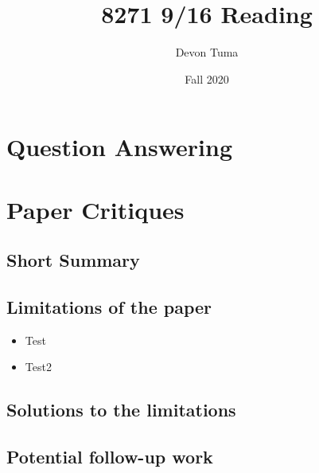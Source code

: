 \documentclass[11pt]{article}
\title{8271 9/16 Reading}
\author{Devon Tuma}
\date{Fall 2020}
\begin{document}
\maketitle

\section*{Question Answering}

\section*{Paper Critiques}

\subsection*{Short Summary}

\subsection*{Limitations of the paper}

\begin{itemize}
\item Test
\item Test2
\end{itemize}

\subsection*{Solutions to the limitations}

\subsection*{Potential follow-up work}
\end{document}
